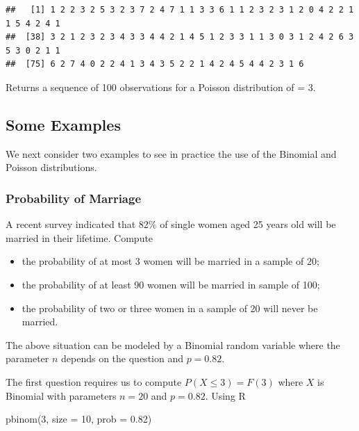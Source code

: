 \documentclass[
]{book}
\newenvironment{Shaded}{\begin{snugshade}}{\end{snugshade}}
\newcommand{\AttributeTok}[1]{\textcolor[rgb]{0.77,0.63,0.00}{#1}}
\newcommand{\DecValTok}[1]{\textcolor[rgb]{0.00,0.00,0.81}{#1}}
\newcommand{\FloatTok}[1]{\textcolor[rgb]{0.00,0.00,0.81}{#1}}
\newcommand{\FunctionTok}[1]{\textcolor[rgb]{0.00,0.00,0.00}{#1}}
\newcommand{\NormalTok}[1]{#1}
\theoremstyle{definition}
\theoremstyle{definition}
\theoremstyle{definition}
\theoremstyle{definition}
\theoremstyle{remark}
\begin{document}
\begin{verbatim}
##   [1] 1 2 2 3 2 5 3 2 3 7 2 4 7 1 1 3 3 6 1 1 2 3 2 3 1 2 0 4 2 2 1 1 5 4 2 4 1
##  [38] 3 2 1 2 3 2 3 4 3 3 4 4 2 1 4 5 1 2 3 3 1 1 3 0 3 1 2 4 2 6 3 5 3 0 2 1 1
##  [75] 6 2 7 4 0 2 2 4 1 3 4 3 5 2 2 1 4 2 4 5 4 4 2 3 1 6
\end{verbatim}

Returns a sequence of 100 observations for a Poisson distribution of \lambda = 3.

\hypertarget{some-examples}{%
\subsection{Some Examples}\label{some-examples}}

We next consider two examples to see in practice the use of the Binomial and Poisson distributions.

\hypertarget{probability-of-marriage}{%
\subsubsection{Probability of Marriage}\label{probability-of-marriage}}

A recent survey indicated that 82\% of single women aged 25 years old will be married in their lifetime. Compute

\begin{itemize}
\item
  the probability of at most 3 women will be married in a sample of 20;
\item
  the probability of at least 90 women will be married in sample of 100;
\item
  the probability of two or three women in a sample of 20 will never be married.
\end{itemize}

The above situation can be modeled by a Binomial random variable where the parameter \(n\) depends on the question and \(p = 0.82\).

The first question requires us to compute \(P(X\leq 3)= F(3)\) where \(X\) is Binomial with parameters \(n=20\) and \(p =0.82\). Using R

\begin{Shaded}
\begin{Highlighting}[]
\FunctionTok{pbinom}\NormalTok{(}\DecValTok{3}\NormalTok{, }\AttributeTok{size =} \DecValTok{10}\NormalTok{, }\AttributeTok{prob =} \FloatTok{0.82}\NormalTok{)}
\end{Highlighting}
\end{Shaded}
\end{document}
